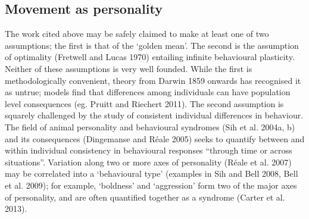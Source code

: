 \documentclass[]{scrartcl}
\begin{document}
\begin{linenumbers}
\section{Movement as personality}\label{movement-as-personality}

The work cited above may be safely claimed to make at least one of two
assumptions; the first is that of the `golden mean'. The second is the assumption of
optimality (Fretwell and Lucas 1970) entailing infinite behavioural
plasticity. Neither of these assumptions is very well founded. While the
first is methodologically convenient, theory from Darwin 1859 onwards
has recognised it as untrue; models find that differences among
individuals can have population level consequences (eg. Pruitt and
Riechert 2011). The second assumption is squarely challenged by the
study of consistent individual differences in behaviour. The field of
animal personality and behavioural syndromes (Sih et al. 2004a, b) and
its consequences
(\protect\hypertarget{__UnoMark__44474_2549695377}{}{\protect\hypertarget{__UnoMark__53900_4107183634}{}{\protect\hypertarget{ZOTERO_BREF_pK0LuydZRLN9}{}{\protect\hypertarget{__UnoMark__39595_623588325}{}{}}}}Dingemanse
and Réale 2005) seeks to quantify between and within individual
consistency in behavioural responses ``through time or across
situations''. Variation along two or more axes of personality
(\protect\hypertarget{__UnoMark__44475_2549695377}{}{\protect\hypertarget{ZOTERO_BREF_S1piFXmJVFzL}{}{\protect\hypertarget{__UnoMark__53901_4107183634}{}{\protect\hypertarget{__UnoMark__39596_623588325}{}{}}}}Réale
et al. 2007) may be correlated into a `behavioural type' (examples in
Sih and Bell 2008, Bell et al. 2009); for example, `boldness' and
`aggression' form two of the major axes of personality, and are often
quantified together as a syndrome (Carter et al. 2013).


\end{linenumbers}
\end{document}

